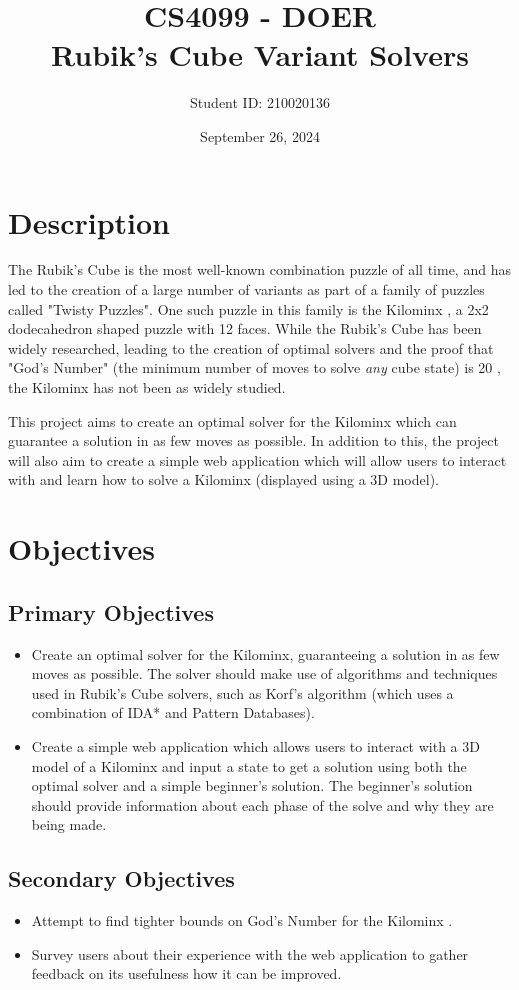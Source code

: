 \documentclass[12pt]{article}
\title{CS4099 - DOER\\Rubik's Cube Variant Solvers}
\author{Student ID: 210020136}
\date{September 26, 2024}
\begin{document}
\maketitle

\section{Description}
The Rubik's Cube \cite{rubikscube} is the most well-known combination puzzle of all time, and has led to the creation of a large number of variants as part of a family of puzzles called "Twisty Puzzles". One such puzzle in this family is the Kilominx \cite{kilominx}, a 2x2 dodecahedron shaped puzzle with 12 faces. While the Rubik's Cube has been widely researched, leading to the creation of optimal solvers and the proof that "God's Number" (the minimum number of moves to solve \textit{any} cube state) is 20 \cite{godsnumber}, the Kilominx has not been as widely studied.

This project aims to create an optimal solver for the Kilominx which can guarantee a solution in as few moves as possible. In addition to this, the project will also aim to create a simple web application which will allow users to interact with and learn how to solve a Kilominx (displayed using a 3D model).

\section{Objectives}
\subsection{Primary Objectives}
\begin{itemize}
    \item Create an optimal solver for the Kilominx, guaranteeing a solution in as few moves as possible. The solver should make use of algorithms and techniques used in Rubik's Cube solvers, such as Korf's algorithm \cite{korf} (which uses a combination of IDA* and Pattern Databases).
    \item Create a simple web application which allows users to interact with a 3D model of a Kilominx and input a state to get a solution using both the optimal solver and a simple beginner's solution. The beginner's solution should provide information about each phase of the solve and why they are being made.
\end{itemize}

\subsection{Secondary Objectives}
\begin{itemize}
    \item Attempt to find tighter bounds on God's Number for the Kilominx \cite{kilominxgodbounds}.
    \item Survey users about their experience with the web application to gather feedback on its usefulness how it can be improved.
\end{itemize}
\end{document}

